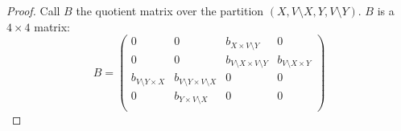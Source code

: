 \begin{problem}
\begin{sol}
\begin{proof}
            Call $B$ the quotient matrix over the partition $(X, V \setminus X, Y, V \setminus Y)$.
            $B$ is a $4 \times 4$ matrix:
            \[
                B =
            \begin{pmatrix}
                0                          & 0                                      & b_{X \times V \setminus Y}             & 0 \\
                0                          & 0                                      & b_{V \setminus X \times V \setminus Y} & b_{V \setminus X \times Y} \\
                b_{V \setminus Y \times X} & b_{V \setminus Y \times V \setminus X} & 0                                      & 0 \\
                0                          & b_{Y \times V \setminus X}             & 0                                      & 0 \\
            \end{pmatrix}
            \]


\end{proof}
\end{sol}
\end{problem}
